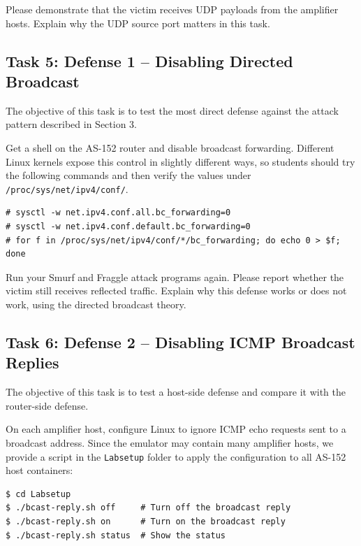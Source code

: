Please demonstrate that the victim receives UDP payloads from the amplifier
hosts. Explain why the UDP source port matters in this task.



\subsection{Task 5: Defense 1 -- Disabling Directed Broadcast}

The objective of this task is to test the most direct defense against the attack
pattern described in Section 3.

Get a shell on the AS-152 router and disable broadcast forwarding. Different
Linux kernels expose this control in slightly different ways, so students should
try the following commands and then verify the values under
\texttt{/proc/sys/net/ipv4/conf/}.

\begin{lstlisting}
# sysctl -w net.ipv4.conf.all.bc_forwarding=0
# sysctl -w net.ipv4.conf.default.bc_forwarding=0
# for f in /proc/sys/net/ipv4/conf/*/bc_forwarding; do echo 0 > $f; done
\end{lstlisting}

Run your Smurf and Fraggle attack programs again. Please report whether the
victim still receives reflected traffic. Explain why this defense works or does
not work, using the directed broadcast theory.


\subsection{Task 6: Defense 2 -- Disabling ICMP Broadcast Replies}

The objective of this task is to test a host-side defense and compare it with
the router-side defense.


On each amplifier host, configure Linux to ignore ICMP echo requests sent to a
broadcast address. Since the emulator may contain many amplifier hosts, we
provide a script in the \texttt{Labsetup} folder to apply the configuration to
all AS-152 host containers:

\begin{lstlisting}
$ cd Labsetup
$ ./bcast-reply.sh off     # Turn off the broadcast reply 
$ ./bcast-reply.sh on      # Turn on the broadcast reply 
$ ./bcast-reply.sh status  # Show the status
\end{lstlisting}

